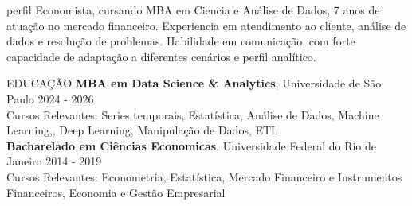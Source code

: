 \documentclass{resume}
\begin{document}
\begin{rSection}{perfil}
{Economista, cursando MBA em Ciencia e Análise de Dados, 7 anos de atuação no mercado financeiro. Experiencia em atendimento ao cliente, análise de dados e resolução de problemas. Habilidade em comunicação, com forte capacidade de adaptação a diferentes cenários e perfil analítico.}
\end{rSection}
\begin{rSection}{EDUCAÇÃO}
{\bf MBA em Data Science \& Analytics}, Universidade de São Paulo \hfill {2024 - 2026}\\
{\footnotesize Cursos Relevantes: Series temporais, Estatística, Análise de Dados, Machine Learning,, Deep Learning, Manipulação de Dados, ETL} \\

\vspace{-1.25em}
{\bf Bacharelado em Ciências Economicas}, Universidade Federal do Rio de Janeiro \hfill {2014 - 2019} \\
\footnotesize{Cursos Relevantes: Econometria, Estatística, Mercado Financeiro e Instrumentos Financeiros, Economia e Gestão Empresarial} 
\end{rSection}
\end{document}
